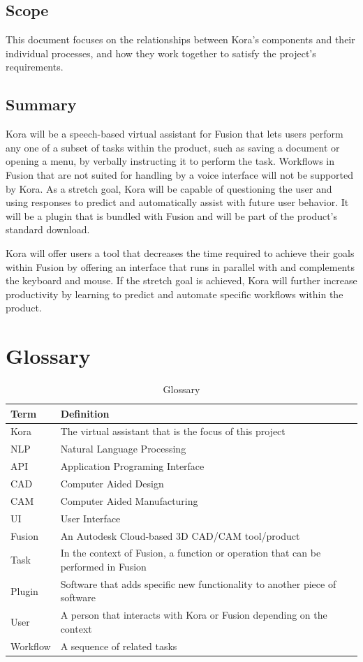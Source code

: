 \documentclass[onecolumn, draftclsnofoot,10pt, compsoc]{IEEEtran}
\def \botname{Kora\xspace}
\begin{document}
	\subsection{Scope}
		This document focuses on the relationships between Kora's components and their individual processes, and how they work together to satisfy the project's requirements.
	
	
	\subsection{Summary}
		Kora will be a speech-based virtual assistant for Fusion that lets users perform any one of a subset of tasks within the product, such as saving a document or opening a menu, by verbally instructing it to perform the task.
		Workflows in Fusion that are not suited for handling by a voice interface will not be supported by Kora.
		As a stretch goal, Kora will be capable of questioning the user and using responses to predict and automatically assist with future user behavior.
		It will be a plugin that is bundled with Fusion and will be part of the product's standard download. 
		
		Kora will offer users a tool that decreases the time required to achieve their goals within Fusion by offering an interface that runs in parallel with and complements the keyboard and mouse.
		If the stretch goal is achieved, Kora will further increase productivity by learning to predict and automate specific workflows within the product.

\section{Glossary}
	\begin{table}[H]
		\centering
		\caption{Glossary}
		\label{my-label}
		\begin{tabular}{|l|l|}
			\hline
			\textbf{Term} & \textbf{Definition} \\ \hline
			\botname & The virtual assistant that is the focus of this project \\ \hline
			NLP & Natural Language Processing \\ \hline
			API & Application Programing Interface \\ \hline
			CAD & Computer Aided Design \\ \hline
			CAM & Computer Aided Manufacturing \\ \hline
            UI & User Interface \\ \hline
			Fusion & An Autodesk Cloud-based 3D CAD/CAM tool/product \\ \hline
			Task & In the context of Fusion, a function or operation that can be performed in Fusion \\ \hline
			Plugin & Software that adds specific new functionality to another piece of software \\ \hline
			User & A person that interacts with Kora or Fusion depending on the context \\ \hline
			Workflow & A sequence of related tasks \\ \hline
		\end{tabular}
	\end{table}
\end{document}
